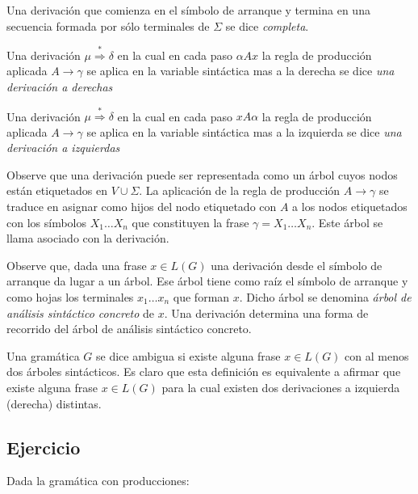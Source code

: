 \begin{definition}
Una derivación que comienza en el símbolo de arranque y termina en una secuencia
formada por sólo terminales de $\Sigma$ se dice \emph{completa}.

Una derivación $\mu  \stackrel{*}{\Longrightarrow}  \delta$ 
en la cual en cada paso $\alpha A x$ la regla de producción aplicada $A \rightarrow \gamma$
se aplica en la variable sintáctica mas a la derecha se dice \emph{una derivación a derechas}

Una derivación $\mu  \stackrel{*}{\Longrightarrow}  \delta$ 
en la cual en cada paso $x A \alpha$ la regla de producción aplicada $A \rightarrow \gamma$
se aplica en la variable sintáctica mas a la izquierda se dice \emph{una derivación a izquierdas}
\end{definition}

\begin{definition}
Observe que una derivación puede ser representada como un árbol cuyos nodos
están etiquetados en $V \cup \Sigma$. La aplicación de la regla de 
producción $A \rightarrow \gamma$ se traduce en asignar como hijos del nodo etiquetado con $A$
a los nodos etiquetados con los símbolos $X_1 \ldots X_n$ que constituyen
la frase $\gamma = X_1 \ldots X_n$.  
Este árbol se llama  asociado 
con la derivación.
\end{definition}

\begin{definition}
\label{definition:arbolconcreto}
Observe que, dada una frase $x \in L(G)$ una derivación desde el
símbolo de arranque da lugar a  un árbol. Ese árbol tiene como raíz el 
símbolo de arranque y como hojas los terminales 
$x_1 \ldots x_n$ que forman $x$. Dicho árbol se denomina \emph{árbol
de análisis sintáctico concreto} de $x$. Una derivación determina
una forma de recorrido del árbol de análisis sintáctico concreto.
\end{definition}

\begin{definition}
Una gramática $G$ se dice ambigua si existe alguna frase $x \in L(G)$
con al menos dos árboles sintácticos. 
Es claro que esta definición es equivalente a afirmar que existe 
alguna frase $x \in L(G)$ para la cual existen dos derivaciones a 
izquierda (derecha) distintas.
\end{definition}

\subsection{Ejercicio}
\label{ejercicio:tutugrammar}
Dada la gramática con producciones:

